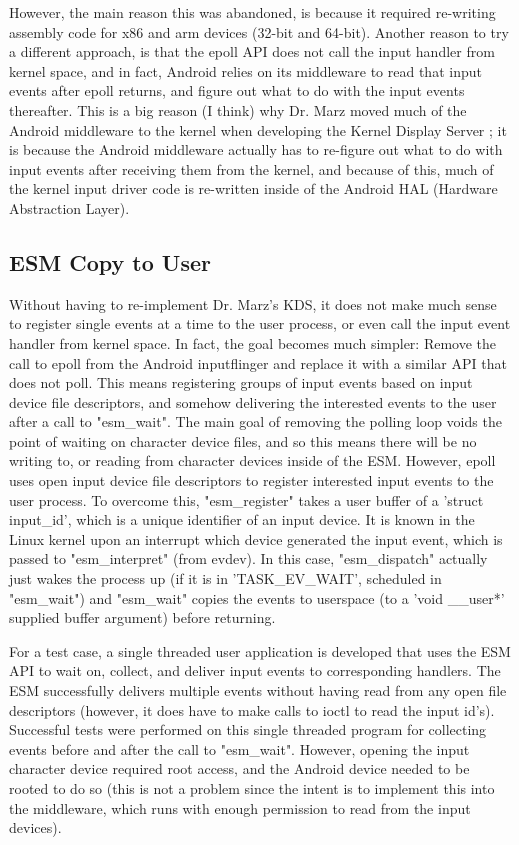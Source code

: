\documentclass[10pt,journal,compsoc]{IEEEtran}
\begin{document}
However, the main reason this was abandoned, is because it required re-writing assembly code for x86 and arm devices (32-bit and 64-bit). Another reason to try a different approach, is that the epoll API does not call the input handler from kernel space, and in fact, Android relies on its middleware to read that input events after epoll returns, and figure out what to do with the input events thereafter. This is a big reason (I think) why Dr. Marz moved much of the Android middleware to the kernel when developing the Kernel Display Server \cite{8413093}; it is because the Android middleware actually has to re-figure out what to do with input events after receiving them from the kernel, and because of this, much of the kernel input driver code is re-written inside of the Android HAL (Hardware Abstraction Layer).

\subsection{ESM Copy to User}
\label{sec:copytouser}
Without having to re-implement Dr. Marz's KDS, it does not make much sense to register single events at a time to the user process, or even call the input event handler from kernel space. In fact, the goal becomes much simpler: Remove the call to epoll from the Android inputflinger and replace it with a similar API that does not poll. This means registering groups of input events based on input device file descriptors, and somehow delivering the interested events to the user after a call to "esm\_wait". The main goal of removing the polling loop voids the point of waiting on character device files, and so this means there will be no writing to, or reading from character devices inside of the ESM. However, epoll uses open input device file descriptors to register interested input events to the user process. To overcome this, "esm\_register" takes a user buffer of a 'struct input\_id', which is a unique identifier of an input device. It is known in the Linux kernel upon an interrupt which device generated the input event, which is passed to "esm\_interpret" (from evdev). In this case, "esm\_dispatch" actually just wakes the process up (if it is in 'TASK\_EV\_WAIT', scheduled in "esm\_wait") and "esm\_wait" copies the events to userspace (to a 'void \_\_user*' supplied buffer argument) before returning. 

For a test case, a single threaded user application is developed that uses the ESM API to wait on, collect, and deliver input events to corresponding handlers. The ESM successfully delivers multiple events without having read from any open file descriptors (however, it does have to make calls to ioctl to read the input id's). Successful tests were performed on this single threaded program for collecting events before and after the call to "esm\_wait". However, opening the input character device required root access, and the Android device needed to be rooted to do so (this is not a problem since the intent is to implement this into the middleware, which runs with enough permission to read from the input devices).
\end{document}

